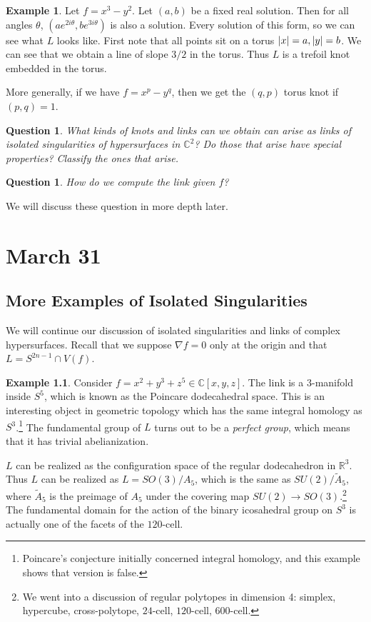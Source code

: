 \documentclass[leqno, openany]{memoir}
\newtheorem{quest}[thm]{Question}
\theoremstyle{definition}
\newtheorem{exm}[thm]{Example}
\theoremstyle{remark}
\theoremstyle{plain}
\theoremstyle{definition}
\theoremstyle{remark}
\newcommand{\R}{\mathbb{R}}
\newcommand{\C}{\mathbb{C}}
\begin{document}
\begin{exm}
    Let $f = x^3 - y^2$. Let $(a,b)$ be a fixed real solution. Then for all angles $\theta$, $(ae^{2i\theta}, be^{3i\theta})$ is also a solution. Every solution of this form, so we can see what $L$ looks like. First note that all points sit on a torus $\abs{x} = a, \abs{y} = b$. We can see that we obtain a line of slope $3/2$ in the torus. Thus $L$ is a trefoil knot embedded in the torus.

    More generally, if we have $f = x^p - y^q$, then we get the $(q,p)$ torus knot if $(p,q) = 1$. 
\end{exm}

\begin{quest}
    What kinds of knots and links can we obtain can arise as links of isolated singularities of hypersurfaces in $\C^2$? Do those that arise have special properties? Classify the ones that arise.
\end{quest}

\begin{quest}
    How do we compute the link given $f$?
\end{quest}

We will discuss these question in more depth later.

\chapter{March 31}%
\label{cha:march_31}

\section{More Examples of Isolated Singularities}%
\label{sec:more_examples_of_isolated_singularities}

We will continue our discussion of isolated singularities and links of complex hypersurfaces. Recall that we suppose $\nabla f = 0$ only at the origin and that $L = S^{2n-1} \cap V(f)$.

\begin{exm}
    Consider $f = x^2 + y^3 + z^5 \in \C[x,y,z]$. The link is a $3$-manifold inside $S^5$, which is known as the Poincare dodecahedral space. This is an interesting object in geometric topology which has the same integral homology as $S^3$.\footnote{Poincare's conjecture initially concerned integral homology, and this example shows that version is false.} The fundamental group of $L$ turns out to be a \textit{perfect group}, which means that it has trivial abelianization.

    $L$ can be realized as the configuration space of the regular dodecahedron in $\R^3$. Thus $L$ can be realized as $L = SO(3)/A_5$, which is the same as $SU(2) / \widetilde{A}_5$, where $\widetilde{A}_5$ is the preimage of $A_5$ under the covering map $SU(2) \to SO(3)$.\footnote{We went into a discussion of regular polytopes in dimension 4: simplex, hypercube, cross-polytope, $24$-cell, $120$-cell, $600$-cell.} The fundamental domain for the action of the binary icosahedral group on $S^3$ is actually one of the facets of the $120$-cell.
\end{exm}
\end{document}
